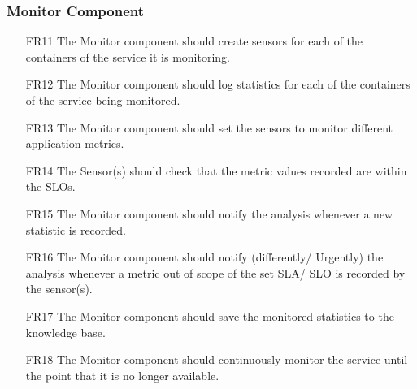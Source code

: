 \subsubsection{\textbf{Monitor Component}}
\begin{itemize}
    \item [FR11] The Monitor component should create sensors for each of the containers of the service it is monitoring.
    \item [FR12] The Monitor component should log statistics for each of the containers of the service being monitored.
    \item [FR13] The Monitor component should set the sensors to monitor different application metrics.
    \item [FR14] The Sensor(s) should check that the metric values recorded are within the SLOs.
    \item [FR15] The Monitor component should notify the analysis whenever a new statistic is recorded. 
    \item [FR16] The Monitor component should notify (differently/ Urgently) the analysis whenever a metric out of scope of the set SLA/ SLO is recorded by the sensor(s).
    \item [FR17] The Monitor component should save the monitored statistics to the knowledge base.
    \item [FR18] The Monitor component should continuously monitor the service until the point that it is no longer available.
\end{itemize}

